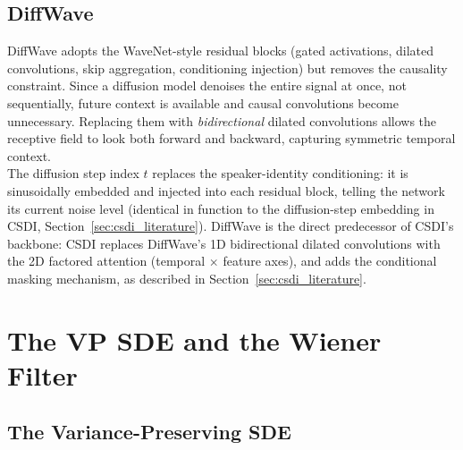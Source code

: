 \subsection{DiffWave}

DiffWave \cite{kong2021diffwave} adopts the WaveNet-style residual blocks
(gated activations, dilated convolutions, skip aggregation, conditioning
injection) but removes the causality constraint. Since a diffusion model
denoises the entire signal at once, not sequentially, future context is
available and causal convolutions become unnecessary. Replacing them with
\textit{bidirectional} dilated convolutions allows the receptive field to
look both forward and backward, capturing symmetric temporal context.\\

The diffusion step index $t$ replaces the speaker-identity conditioning: it
is sinusoidally embedded and injected into each residual block, telling the
network its current noise level (identical in function to the diffusion-step
embedding in CSDI, Section~\ref{sec:csdi_literature}). DiffWave is the direct
predecessor of CSDI's backbone: CSDI replaces DiffWave's 1D bidirectional
dilated convolutions with the 2D factored attention (temporal $\times$
feature axes), and adds the conditional masking mechanism, as described in
Section~\ref{sec:csdi_literature}.

\section{The VP SDE and the Wiener Filter}
\label{app:sec:vp_wiener}

\subsection{The Variance-Preserving SDE}
\label{app:subsec:vp_sde}

